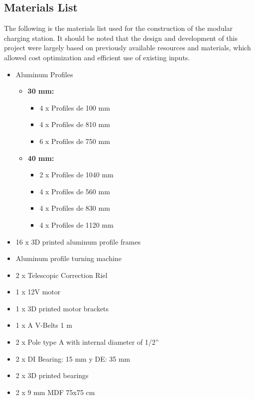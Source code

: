 \subsection{Materials List}
The following is the materials list used for the construction of the modular charging station. It should be noted that the design and development of this project were largely based on previously available resources and materials, which allowed cost optimization and efficient use of existing inputs.    \begin{itemize}
        \item Aluminum Profiles
            \begin{itemize}
                \item \textbf{30 mm:}
                \begin{itemize}
                \item 4 x Profiles de 100 mm
                \item 4 x Profiles de 810 mm
                \item 6 x Profiles de 750 mm
                \end{itemize}
                \item \textbf{40 mm:}
                \begin{itemize}
                \item 2 x Profiles de 1040 mm
                \item 4 x Profiles de 560 mm
                \item 4 x Profiles de 830 mm
                \item 4 x Profiles de 1120 mm
                \end{itemize}
            \end{itemize}
            \item 16 x 3D printed aluminum profile frames
            \item Aluminum profile turning machine
            \item 2 x Telescopic Correction Riel
            \item 1 x 12V motor
            \item 1 x 3D printed motor brackets
            \item 1 x A V-Belts 1 m 
            \item 2 x Pole type A with internal diameter of 1/2”
            \item 2 x DI Bearing: 15 mm y DE: 35 mm
            \item 2 x 3D printed bearings
            \item 2 x 9 mm MDF 75x75 cm

\end{itemize}
